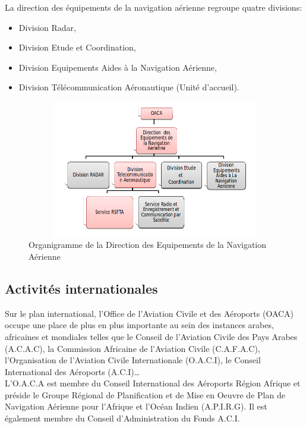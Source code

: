 La direction des équipements de la navigation aérienne regroupe quatre divisions:\\
\begin{itemize}
\item Division Radar, \\
\item Division Etude et Coordination,\\
\item Division Equipements Aides à la Navigation Aérienne,\\
\item Division Télécommunication Aéronautique (Unité d’accueil).
\end{itemize}
\begin{figure}[!h]
\begin{center}
\includegraphics[width=15cm,height=6cm]{presentation/organisme.png}
\end{center}
\caption{Organigramme de la Direction des Equipements de la Navigation Aérienne}
\end{figure}
\subsection{Activités internationales}
Sur le plan international, l’Office de l’Aviation Civile et des Aéroports (OACA) occupe une place de plus en plus importante au sein des instances arabes, africaines et mondiales telles que le Conseil de l’Aviation Civile des Pays Arabes (A.C.A.C), la Commission Africaine de l’Aviation Civile (C.A.F.A.C), l’Organisation de l’Aviation Civile Internationale (O.A.C.I), le Conseil International des Aéroports (A.C.I)… \\

L’O.A.C.A est membre du Conseil International des Aéroports Région Afrique et préside le Groupe Régional de Planification et de Mise en Oeuvre de Plan de Navigation Aérienne pour l’Afrique et l’Océan Indien (A.P.I.R.G). Il est également membre du Conseil d’Administration du Fonds A.C.I.\\

